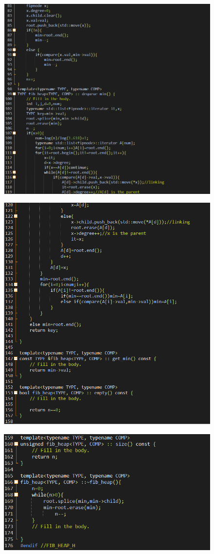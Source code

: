 \documentclass[12pt]{article}
\begin{document}
\begin{figure}[H]
\centering
\includegraphics[scale=0.5]{P15.png}
\end{figure}
\begin{figure}[H]
\centering
\includegraphics[scale=0.5]{P16.png}
\end{figure}
\begin{figure}[H]
\centering
\includegraphics[scale=0.6]{P17.png}
\end{figure}
\end{document}
